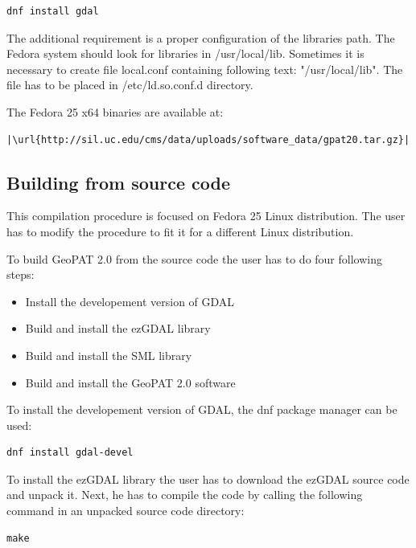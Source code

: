 \documentclass[12pt,margin=0.5in]{article}
\begin{document}
\begin{appendices}
\begin{lstlisting}
dnf install gdal
\end{lstlisting}

The additional requirement is a proper configuration of the libraries path.
The Fedora system should look for libraries in /usr/local/lib.
Sometimes it is necessary to create file local.conf containing following
text: "/usr/local/lib".
The file has to be placed in /etc/ld.so.conf.d directory.

The Fedora 25 x64 binaries are available at:

\begin{lstlisting}[escapechar=|]
|\url{http://sil.uc.edu/cms/data/uploads/software_data/gpat20.tar.gz}|
\end{lstlisting}

\subsection{Building from source code}

This compilation procedure is focused on Fedora 25
Linux distribution. The user has to modify the procedure
to fit it for a different Linux distribution.

To build GeoPAT 2.0 from the source code the user has to do four following steps:

\begin{itemize}
    \item{Install the developement version of GDAL}
    \item{Build and install the ezGDAL library}
    \item{Build and install the SML library}
    \item{Build and install the GeoPAT 2.0 software}
\end{itemize}

To install the developement version of GDAL, the dnf package manager can be used:

\begin{lstlisting}
dnf install gdal-devel
\end{lstlisting}

To install the ezGDAL library the user has to download the ezGDAL source
code and unpack it. Next, he has to compile the code by calling the following
command in an unpacked source code directory:

\begin{lstlisting}
make
\end{lstlisting}


\end{appendices}
\end{document}
